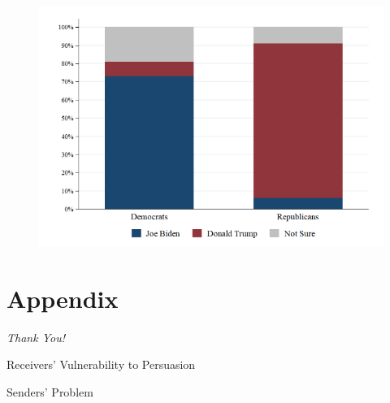 \documentclass[aspectratio=169]{beamer}
\theoremstyle{definition}
\theoremstyle{plain}
\theoremstyle{plain}
\theoremstyle{definition}
\theoremstyle{plain}
\theoremstyle{plain}
\theoremstyle{plain}
\theoremstyle{plain}
\theoremstyle{remark}
\theoremstyle{definition}
\begin{document}
\begin{figure}
    \centering
    \includegraphics[width=0.8\linewidth]{PresentationImage.png}
    \label{fig:enter-label}
\end{figure}



\section{Appendix}

\begin{frame}{}
    \centering \Huge
    \emph{Thank You!}
\end{frame}

\begin{frame}[label=RP]{Receivers' Vulnerability to Persuasion}
\end{frame}

\begin{frame}[label=SP]{Senders' Problem}
\end{frame}
\end{document}
